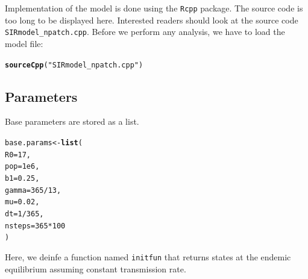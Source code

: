 \documentclass[12pt]{article}\usepackage[]{graphicx}\usepackage[]{color}
\makeatletter
\newcommand{\hlnum}[1]{\textcolor[rgb]{0.686,0.059,0.569}{#1}}%
\newcommand{\hlstr}[1]{\textcolor[rgb]{0.192,0.494,0.8}{#1}}%
\newcommand{\hlopt}[1]{\textcolor[rgb]{0,0,0}{#1}}%
\newcommand{\hlstd}[1]{\textcolor[rgb]{0.345,0.345,0.345}{#1}}%
\newcommand{\hlkwb}[1]{\textcolor[rgb]{0.69,0.353,0.396}{#1}}%
\newcommand{\hlkwc}[1]{\textcolor[rgb]{0.333,0.667,0.333}{#1}}%
\newcommand{\hlkwd}[1]{\textcolor[rgb]{0.737,0.353,0.396}{\textbf{#1}}}%
\newenvironment{kframe}{%
 \def\at@end@of@kframe{}%
 \ifinner\ifhmode%
  \def\at@end@of@kframe{\end{minipage}}%
  \begin{minipage}{\columnwidth}%
 \fi\fi%
 \def\FrameCommand##1{\hskip\@totalleftmargin \hskip-\fboxsep
 \colorbox{shadecolor}{##1}\hskip-\fboxsep
     \hskip-\linewidth \hskip-\@totalleftmargin \hskip\columnwidth}%
 \MakeFramed {\advance\hsize-\width
   \@totalleftmargin\z@ \linewidth\hsize
   \@setminipage}}%
 {\par\unskip\endMakeFramed%
 \at@end@of@kframe}
\newenvironment{knitrout}{}{} %
\makeatother
\begin{document}
Implementation of the model is done using the \texttt{Rcpp} package.
The source code is too long to be displayed here. 
Interested readers should look at the source code \texttt{SIRmodel\_npatch.cpp}.
Before we perform any analysis, we have to load the model file:
\begin{knitrout}
\color{fgcolor}\begin{kframe}
\begin{alltt}
\hlkwd{sourceCpp}\hlstd{(}\hlstr{"SIRmodel_npatch.cpp"}\hlstd{)}
\end{alltt}


{\ttfamily\noindent{}}

{\ttfamily\noindent\bfseries{}}\end{kframe}
\end{knitrout}

\subsection{Parameters}

Base parameters are stored as a list.

\begin{knitrout}
\color{fgcolor}\begin{kframe}
\begin{alltt}
\hlstd{base.params} \hlkwb{<-} \hlkwd{list}\hlstd{(}
    \hlkwc{R0}\hlstd{=}\hlnum{17}\hlstd{,}
    \hlkwc{pop}\hlstd{=}\hlnum{1e6}\hlstd{,}
    \hlkwc{b1}\hlstd{=}\hlnum{0.25}\hlstd{,}
    \hlkwc{gamma}\hlstd{=}\hlnum{365}\hlopt{/}\hlnum{13}\hlstd{,}
    \hlkwc{mu}\hlstd{=}\hlnum{0.02}\hlstd{,}
    \hlkwc{dt}\hlstd{=}\hlnum{1}\hlopt{/}\hlnum{365}\hlstd{,}
    \hlkwc{nsteps}\hlstd{=}\hlnum{365}\hlopt{*}\hlnum{100}
\hlstd{)}
\end{alltt}
\end{kframe}
\end{knitrout}


Here, we deinfe a function named \texttt{initfun} that returns states at the endemic equilibrium assuming constant transmission rate.
\end{document}
